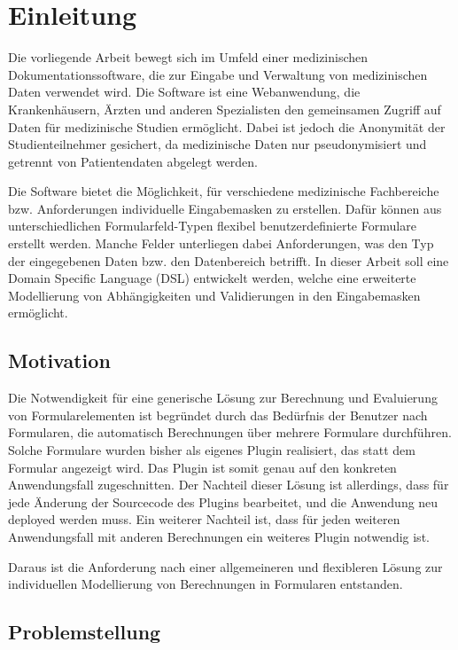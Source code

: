 \chapter{Einleitung}

Die vorliegende Arbeit bewegt sich im Umfeld einer medizinischen Dokumentationssoftware, die zur Eingabe und
Verwaltung von medizinischen Daten verwendet wird. Die Software ist eine Webanwendung, die
Krankenhäusern, Ärzten und anderen Spezialisten den gemeinsamen Zugriff auf Daten für medizinische
Studien ermöglicht. Dabei ist jedoch die Anonymität der Studienteilnehmer gesichert, da medizinische Daten
nur pseudonymisiert und getrennt von Patientendaten abgelegt werden.

Die Software bietet die Möglichkeit, für verschiedene medizinische Fachbereiche bzw. Anforderungen
individuelle Eingabemasken zu erstellen. Dafür können aus unterschiedlichen Formularfeld-Typen flexibel
benutzerdefinierte Formulare erstellt werden. Manche Felder unterliegen dabei Anforderungen, was den Typ
der eingegebenen Daten bzw. den Datenbereich betrifft. In dieser Arbeit soll eine Domain Specific Language (DSL) entwickelt werden, 
welche eine erweiterte Modellierung von Abhängigkeiten und Validierungen in den Eingabemasken ermöglicht.


\section{Motivation}

Die Notwendigkeit für eine generische Lösung zur Berechnung und Eva\-lu\-ie\-rung von Formularelementen
ist begründet durch das Bedürfnis der Benutzer nach Formularen, die automatisch Berechnungen über
mehrere Formulare durchführen. Solche Formulare wurden bisher als eigenes Plugin realisiert, das statt dem Formular 
angezeigt wird. Das Plugin ist somit genau auf den konkreten Anwendungsfall zugeschnitten. Der Nachteil dieser
Lösung ist allerdings, dass für jede Änderung der Sourcecode des Plugins bearbeitet, und die Anwendung 
neu deployed werden muss. Ein weiterer Nachteil ist, dass für jeden weiteren Anwendungsfall mit anderen Berechnungen
ein weiteres Plugin notwendig ist.

Daraus ist die Anforderung nach einer allgemeineren und flexibleren Lösung zur individuellen Modellierung von 
Berechnungen in Formularen entstanden.


\section{Problemstellung}

